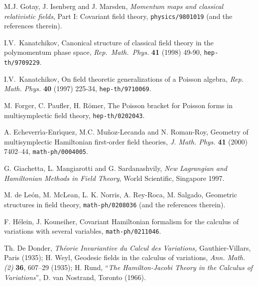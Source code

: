 \documentclass[12pt]{article}
\makeatletter
\def\section{\@startsection {section}{1}{\z@}{-3.5ex plus -1ex minus
     -.2ex}{2.3ex plus .2ex}{\normalsize\bf}}
\makeatother
\begin{document}

\begin{thebibliography}{99}


 M.J. Gotay,   J. Isenberg and J. Marsden, 
{\sl Momentum  maps and classical relativistic fields\/},  
Part I:  Covariant field theory,   
{\tt physics/9801019}  (and the references therein). 

 I.V.~Kanatchikov, 
Canonical structure of classical 
field theory in the polymomentum phase space,    
{\em Rep.~Math.~Phys.\/} {\bf 41} (1998) 49-90,   
{\tt hep-th/9709229}.  

 I.V.~Kanatchikov, 
 On field theoretic generalizations of a Poisson algebra,   
{\em Rep. Math. Phys.\/} {\bf 40} (1997)  225-34,     
{\tt hep-th/9710069}. 

 M. Forger, C. Paufler, H. R\"omer, 
The Poisson bracket for Poisson forms in multisymplectic field theory, 
{\tt hep-th/0202043}.  

 A. Echeverr{\'\i}a-Enr{\'\i}quez,  
M.C.  Mu\~noz-Lecanda and   N. Roman-Roy, 
Geometry of multisymplectic Hamiltonian first-order field theories,  
{\em J. Math. Phys.\/} {\bf 41} (2000) 7402--44, 
{\tt math-ph/0004005}.  

 G. Giachetta, L. Mangiarotti  
and  G. Sardanashvily,  
 {\em New Lagrangian and Hamiltonian Methods in Field Theory\/},  
 World Scientific,  Singapore 1997. 


 M. de Le\'on, M. McLean, L. K. Norris, 
A. Rey-Roca, M. Salgado, 
Geometric structures in field theory, 
{\tt math-ph/0208036}  (and the references therein).  
 
 F. H\'elein, J. Kouneiher, 
Covariant Hamiltonian formalism for the calculus 
of variations with several variables, 
{\tt math-ph/0211046}. 

Th. De Donder, 
{\em Th\'eorie Invariantive du Calcul des Variations, }  
 Gauthier-Villars, Paris (1935);  
H. Weyl, 
 {Geodesic fields in the calculus of variations, } 
 {\em Ann. Math. (2)} {\bf 36}, 607--29 (1935); 
H. Rund, 
``{\em The Hamilton-Jacobi Theory in the Calculus of 
Variations}'', D. van Nostrand, Toronto (1966).  



\end{thebibliography}
\end{document}
